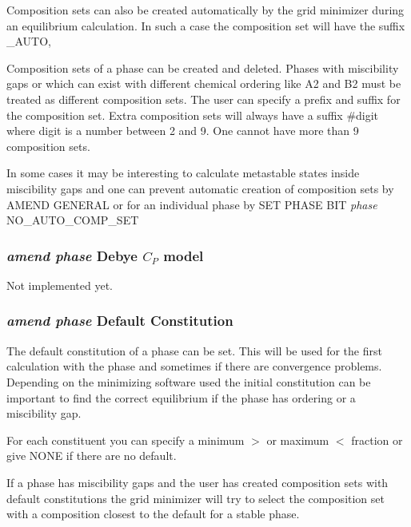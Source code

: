 \documentclass[12pt]{article}
\begin{document}
Composition sets can also be created automatically by the grid
minimizer during an equilibrium calculation.  In such a case the
composition set will have the suffix \_AUTO,

Composition sets of a phase can be created and deleted.  Phases with
miscibility gaps or which can exist with different chemical ordering
like A2 and B2 must be treated as different composition sets.  The
user can specify a prefix and suffix for the composition set.  Extra
composition sets will always have a suffix \#digit where digit is a
number between 2 and 9.  One cannot have more than 9 composition sets.

In some cases it may be interesting to calculate metastable states
inside miscibility gaps and one can prevent automatic creation of
composition sets by {\rm AMEND GENERAL} or for an individual phase by
{\rm SET PHASE BIT {\em phase} NO\_AUTO\_COMP\_SET}

\subsubsection{{\em amend phase} Debye $C_P$ model}

Not implemented yet.

\subsubsection{{\em amend phase} Default Constitution}

The default constitution of a phase can be set.  This will be used for
the first calculation with the phase and sometimes if there are
convergence problems.  Depending on the minimizing software used the
initial constitution can be important to find the correct equilibrium
if the phase has ordering or a miscibility gap.

For each constituent you can specify a minimum $>$ or maximum $<$
fraction or give NONE if there are no default.

If a phase has miscibility gaps and the user has created composition
sets with default constitutions the grid minimizer will try to select
the composition set with a composition closest to the default for a
stable phase.
\end{document}
